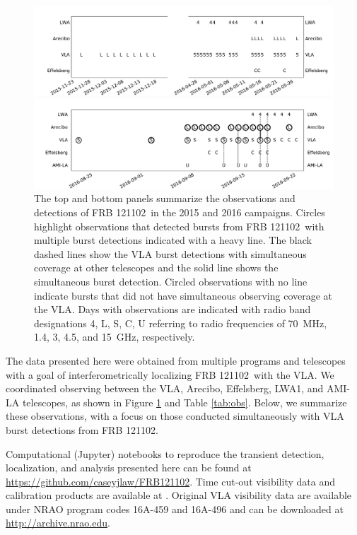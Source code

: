\documentclass[twocolumn]{aastex61}
\newcommand{\frb}{FRB 121102}
\begin{document}
\begin{figure}[t]
\begin{center}
\includegraphics[width=2\columnwidth]{timeline0.pdf}

\includegraphics[width=2\columnwidth]{timeline.pdf}
\caption{The top and bottom panels summarize the observations and detections of \frb\ in the 2015 and 2016 campaigns. Circles highlight observations that detected bursts from \frb\ with multiple burst detections indicated with a heavy line. The black dashed lines show the VLA burst detections with simultaneous coverage at other telescopes and the solid line shows the simultaneous burst detection. Circled observations with no line indicate bursts that did not have simultaneous observing coverage at the VLA. Days with observations are indicated with radio band designations 4, L, S, C, U referring to radio frequencies of 70~MHz, 1.4, 3, 4.5, and 15~GHz, respectively.
\label{fig:sched}}
\end{center}
\end{figure}

The data presented here were obtained from multiple programs and telescopes with a goal of interferometrically localizing \frb\ with the VLA. We coordinated observing between the VLA, Arecibo, Effelsberg, LWA1, and AMI-LA telescopes, as shown in Figure \ref{fig:sched} and Table \ref{tab:obs}. Below, we summarize these observations, with a focus on those conducted simultaneously with VLA burst detections from \frb.

Computational (Jupyter) notebooks to reproduce the transient detection, localization, and analysis presented here can be found at \url{https://github.com/caseyjlaw/FRB121102}. Time cut-out visibility data and calibration products are available at . Original VLA visibility data are available under NRAO program codes 16A-459 and 16A-496 and can be downloaded at \url{http://archive.nrao.edu}.
\end{document}
